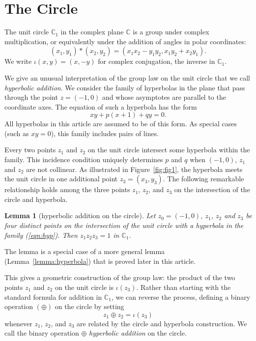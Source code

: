 \documentclass[12pt]{article}
\newtheorem{lemma}[theorem]{Lemma}
\newcommand{\ring}[1]{\mathbb{#1}}
\begin{document}
\section{The Circle}

The unit circle $\ring{C}_1$ in the complex plane $\ring{C}$ is a
group under complex multiplication, or equivalently under the addition
of angles in polar coordinates:
\begin{equation}\label{eqn:cx}
(x_1,y_1) * (x_2,y_2) = (x_1 x_2 - y_1 y_2,x_1 y_2 + x_2 y_1).
\end{equation}
We write $\iota(x,y) = (x,-y)$ for complex conjugation, the inverse in
$\ring{C}_1$.

We give an unusual interpretation of the group law on the unit circle
that we call {\it hyperbolic addition}.  We consider the family of
hyperbolas in the plane that pass through the point $z=(-1,0)$ and
whose asymptotes are parallel to the coordinate axes.  The equation of
such a hyperbola has the form
\begin{equation}\label{eqn:hyp}
x y + p (x+1) + q y = 0.
\end{equation}
All hyperbolas in this article are assumed to be of this form.  As
special cases (such as $x y=0$), this family includes pairs of lines.
 
  Every two points $z_1$ and $z_2$ on the unit circle intersect some
  hyperbola within the family.  This incidence condition uniquely
  determines $p$ and $q$ when $(-1,0)$, $z_1$ and $z_2$ are not
  collinear.  As illustrated in Figure~\ref{fig:fig1}, the hyperbola
  meets the unit circle in one additional point $z_3 = (x_3,y_3)$.
  The following remarkable relationship holds among the three points
  $z_1$, $z_2$, and $z_3$ on the intersection of the circle and
  hyperbola.

\begin{lemma}[hyperbolic addition on the circle] \label{lemma:ha} Let
  $z_0=(-1,0)$, $z_1$, $z_2$ and $z_3$ be four distinct points on the
  intersection of the unit circle with a hyperbola in the family (\ref{eqn:hyp}).  
  Then $z_1 z_2 z_3 = 1$ in $\ring{C}_1$.
\end{lemma}

The lemma is a special case of a more general lemma
(Lemma~\ref{lemma:hyperbola}) that is proved later in this article.

This gives a geometric construction of the group law: the product of
the two points $z_1$ and $z_2$ on the unit circle is $\iota(z_3)$.
Rather than starting with the standard formula for addition in $\ring{C}_1$, 
we can reverse
the process, defining a binary operation $(\oplus)$ on the circle by setting
\[
z_1 \oplus z_2 = \iota(z_3)
\]
whenever $z_1$, $z_2$, and $z_3$ are related by the circle and
hyperbola construction.  We call the binary operation $\oplus$ {\it
  hyperbolic addition} on the circle.
\end{document}
